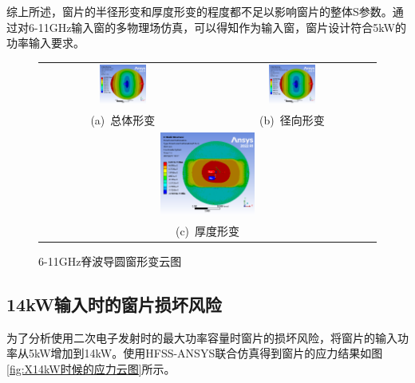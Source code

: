 \documentclass[master]{thesis-uestc}
\begin{document}
综上所述，窗片的半径形变和厚度形变的程度都不足以影响窗片的整体S参数。通过对6-11GHz输入窗的多物理场仿真，可以得知作为输入窗，窗片设计符合5kW的功率输入要求。
\begin{figure}[!htb]
    \small
    \centering
    \begin{tabular}{@{\ }c@{\ }c}
        \includegraphics[width=0.29\textwidth]{pic/chapter3/X输入窗总形变.png} & 
        \hspace{5pt}
        \includegraphics[width=0.29\textwidth]{pic/chapter3/X输入窗径向形变.png}     \\
        \mbox{\small (a) 总体形变}                                                                               & 
        \mbox{\small (b) 径向形变}                                                           \\[6bp]
        \multicolumn{2}{c}{\includegraphics[width=0.29\textwidth]{pic/chapter3/X输入窗厚度形变.png}} \\  %
        \multicolumn{2}{c}{\mbox{\small (c) 厚度形变}}             
    \end{tabular}
    \caption{6-11GHz脊波导圆窗形变云图}
    \label{fig:X输入窗形变}
\end{figure}

\subsection{14kW输入时的窗片损坏风险}\label{subsec:14kW输入时的窗片损坏风险}
为了分析使用二次电子发射时的最大功率容量时窗片的损坏风险，将窗片的输入功率从5kW增加到14kW。使用HFSS-ANSYS联合仿真得到窗片的应力结果如图\ref{fig:X14kW时候的应力云图}所示。
\end{document}
